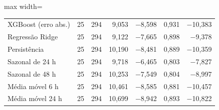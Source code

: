 \begin{table}[!htbp]
\begin{adjustbox}{max width=\textwidth}
\begin{tabular}{lrrrrrr}
        XGBoost (erro abs.) & 25 & 294 & 9,053 & $-$8,598 & 0,931 & $-$10,383 \\
        Regressão Ridge & 25 & 294 & 9,122 & $-$7,665 & 0,898 & $-$9,378 \\
        Persistência & 25 & 294 & 10,190 & $-$8,481 & 0,889 & $-$10,359 \\
        Sazonal de 24 h & 25 & 294 & 9,718 & $-$6,465 & 0,803 & $-$7,827 \\
        Sazonal de 48 h & 25 & 294 & 10,253 & $-$7,549 & 0,804 & $-$8,997 \\
        Média móvel 6 h & 25 & 294 & 10,461 & $-$8,585 & 0,881 & $-$10,457 \\
        Média móvel 24 h & 25 & 294 & 10,699 & $-$8,942 & 0,893 & $-$10,822 \\
        \bottomrule
    \end{tabular}
    \end{adjustbox}
\end{table}
